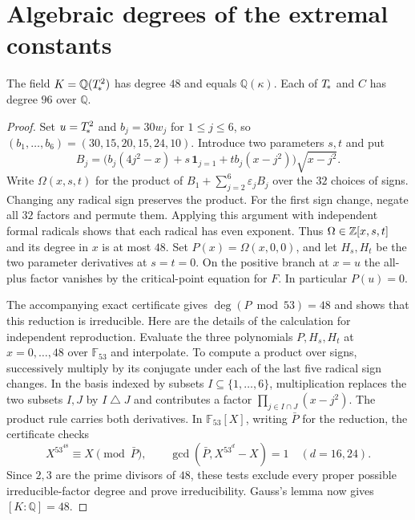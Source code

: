 \section{Algebraic degrees of the extremal constants}

\begin{theorem}\label{th:degree}
The field $K=\mathbb Q(T_{\!*}^2)$ has degree $48$ and equals
$\mathbb Q(\kappa)$. Each of $T_{\!*}$ and $C$ has degree $96$ over $\mathbb Q$.
\end{theorem}

\begin{proof}
Set $u=T_{\!*}^2$ and $b_j=30w_j$ for $1\le j\le6$, so
$(b_1,\ldots,b_6)=(30,15,20,15,24,10)$. Introduce two
parameters $s,t$ and put
\[
 B_j=\bigl(b_j(4j^2-x)+s\,\mathbf1_{j=1}
              +t b_j(x-j^2)\bigr)\sqrt{x-j^2}.
\]
Write $\Omega(x,s,t)$ for the product of $B_1+\sum_{j=2}^6\varepsilon_j B_j$
over the $32$ choices of signs. Changing any radical sign preserves the product.
For the first sign change, negate all $32$ factors and permute them. Applying
this argument with independent formal radicals shows that each radical has
even exponent. Thus $\Omega\in\mathbb Z[x,s,t]$ and its degree in $x$ is at most $48$.
Set $P(x)=\Omega(x,0,0)$, and let $H_s,H_t$ be the two parameter derivatives
at $s=t=0$. On the positive branch at $x=u$ the all-plus factor vanishes by
the critical-point equation for $F$. In particular $P(u)=0$.

The accompanying exact certificate gives $\deg(P\bmod 53)=48$ and shows
that this reduction is irreducible. Here are the details of the calculation
for independent reproduction. Evaluate the three polynomials $P,H_s,H_t$ at
$x=0,\ldots,48$ over $\mathbb F_{53}$ and interpolate. To compute a product
over signs, successively multiply by its conjugate under each of the last
five radical sign changes. In the basis indexed by subsets $I\subseteq
\{1,\ldots,6\}$, multiplication replaces the two subsets $I,J$ by
$I\mathbin\triangle J$ and contributes a factor
$\prod_{j\in I\cap J}(x-j^2)$. The product rule carries both derivatives.
In $\mathbb F_{53}[X]$, writing $\bar P$ for the reduction, the certificate
checks
\[
 X^{53^{48}}\equiv X\pmod{\bar P},\qquad
 \gcd(\bar P,X^{53^d}-X)=1\quad(d=16,24).
\]
Since $2,3$ are the prime divisors of $48$, these tests exclude every
proper possible irreducible-factor degree and prove irreducibility. Gauss's
lemma now gives $[K:\mathbb Q]=48$.


\end{proof}

